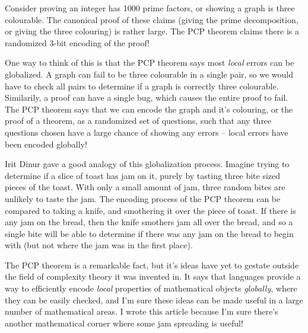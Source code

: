 \documentclass{article}
\theoremstyle{plain}
\theoremstyle{remark}
\theoremstyle{definition}
\begin{document}
\begin{multicols}{2}
Consider proving an integer has 1000 prime factors, or showing a graph is three colourable. The canonical proof of these claims (giving the prime decomposition, or giving the three colouring) is rather large. The PCP theorem claims there is a randomized 3-bit encoding of the proof!

 One way to think of this is that the PCP theorem says most {\it local} errors can be globalized. A graph can fail to be three colourable in a single pair, so we would have to check all pairs to determine if a graph is correctly three colourable. Similarily, a proof can have a single bug, which causes the entire proof to fail. The PCP theorem says that we can encode the graph and it's colouring, or the proof of a theorem, as a randomized set of questions, such that any three questions chosen have a large chance of showing any errors -- local errors have been encoded globally!

Irit Dinur gave a good analogy of this globalization process. Imagine trying to determine if a slice of toast has jam on it, purely by tasting three bite sized pieces of the toast. With only a small amount of jam, three random bites are unlikely to taste the jam. The encoding process of the PCP theorem can be compared to taking a knife, and smothering it over the piece of toast. If there is any jam on the bread, then the knife smothers jam all over the bread, and so a single bite will be able to determine if there was any jam on the bread to begin with (but not where the jam was in the first place).

The PCP theorem is a remarkable fact, but it's ideas have yet to gestate outside the field of complexity theory it was invented in. It says that languages provide a way to efficiently encode {\it local} properties of mathematical objects {\it globally}, where they can be easily checked, and I'm sure these ideas can be made useful in a large number of mathematical areas. I wrote this article because I'm sure there's another mathematical corner where some jam spreading is useful!
\end{multicols}
    
\end{document}
